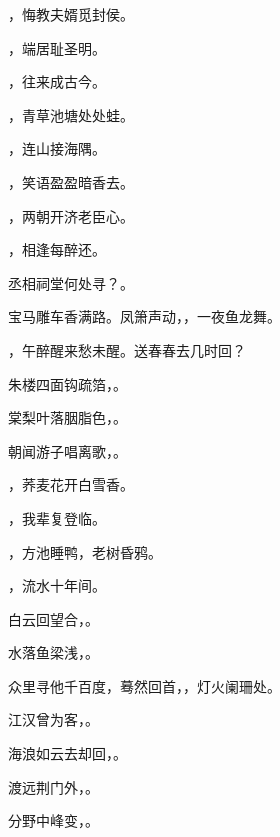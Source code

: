 \documentclass[12pt, a4paper, addpoints]{exam}
\begin{document}
\begin{multicols}{2}
\begin{questions}
\question[2] \uline{\qquad\qquad\qquad\qquad}，悔教夫婿觅封侯。

\question[2] \uline{\qquad\qquad\qquad\qquad}，端居耻圣明。

\question[2] \uline{\qquad\qquad\qquad\qquad}，往来成古今。

\question[2] \uline{\qquad\qquad\qquad\qquad}，青草池塘处处蛙。

\question[2] \uline{\qquad\qquad\qquad\qquad}，连山接海隅。

\question[2] \uline{\qquad\qquad\qquad\qquad}，笑语盈盈暗香去。

\question[2] \uline{\qquad\qquad\qquad\qquad}，两朝开济老臣心。

\question[2] \uline{\qquad\qquad\qquad\qquad}，相逢每醉还。

\question[2] 丞相祠堂何处寻？\uline{\qquad\qquad\qquad\qquad}。

\question[2] 宝马雕车香满路。凤箫声动，\uline{\qquad\qquad\qquad\qquad}，一夜鱼龙舞。

\question[2] \uline{\qquad\qquad\qquad\qquad}，午醉醒来愁未醒。送春春去几时回？

\question[2] 朱楼四面钩疏箔，\uline{\qquad\qquad\qquad\qquad}。

\question[2] 棠梨叶落胭脂色，\uline{\qquad\qquad\qquad\qquad}。

\question[1] 朝闻游子唱离歌，\uline{\qquad\qquad\qquad\qquad}。

\question[2] \uline{\qquad\qquad\qquad\qquad}，荞麦花开白雪香。

\question[2] \uline{\qquad\qquad\qquad\qquad}，我辈复登临。

\question[2] \uline{\qquad\qquad\qquad\qquad}，方池睡鸭，老树昏鸦。

\question[1] \uline{\qquad\qquad\qquad\qquad}，流水十年间。

\question[2] 白云回望合，\uline{\qquad\qquad\qquad\qquad}。

\question[2] 水落鱼梁浅，\uline{\qquad\qquad\qquad\qquad}。

\question[2] 众里寻他千百度，蓦然回首，\uline{\qquad\qquad\qquad\qquad}，灯火阑珊处。

\question[1] 江汉曾为客，\uline{\qquad\qquad\qquad\qquad}。

\question[2] 海浪如云去却回，\uline{\qquad\qquad\qquad\qquad}。

\question[2] 渡远荆门外，\uline{\qquad\qquad\qquad\qquad}。

\question[2] 分野中峰变，\uline{\qquad\qquad\qquad\qquad}。

\end{questions}
\end{multicols}
\end{document}

